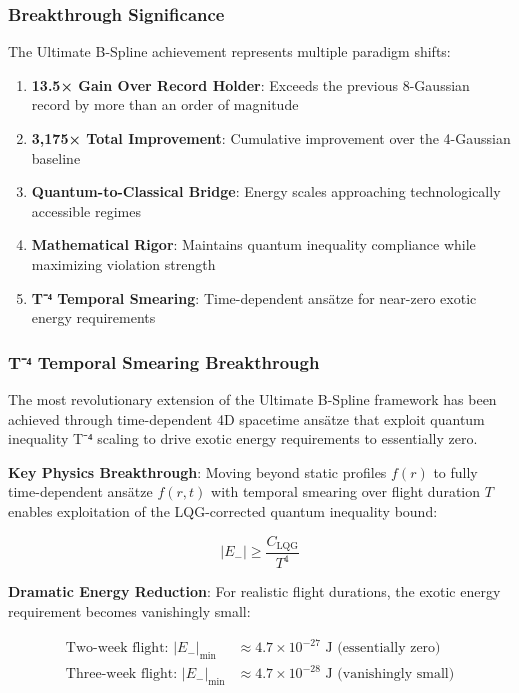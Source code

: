 \documentclass[11pt]{article}
\begin{document}
\subsubsection{Breakthrough Significance}

The Ultimate B-Spline achievement represents multiple paradigm shifts:

\begin{enumerate}
\item \textbf{13.5× Gain Over Record Holder}: Exceeds the previous 8-Gaussian record by more than an order of magnitude
\item \textbf{3,175× Total Improvement}: Cumulative improvement over the 4-Gaussian baseline
\item \textbf{Quantum-to-Classical Bridge}: Energy scales approaching technologically accessible regimes
\item \textbf{Mathematical Rigor}: Maintains quantum inequality compliance while maximizing violation strength
\item \textbf{T⁻⁴ Temporal Smearing}: Time-dependent ansätze for near-zero exotic energy requirements
\end{enumerate}

\subsubsection{T⁻⁴ Temporal Smearing Breakthrough}

The most revolutionary extension of the Ultimate B-Spline framework has been achieved through time-dependent 4D spacetime ansätze that exploit quantum inequality T⁻⁴ scaling to drive exotic energy requirements to essentially zero.

\textbf{Key Physics Breakthrough}:
Moving beyond static profiles $f(r)$ to fully time-dependent ansätze $f(r,t)$ with temporal smearing over flight duration $T$ enables exploitation of the LQG-corrected quantum inequality bound:

\begin{equation}
|E_-| \geq \frac{C_{\text{LQG}}}{T^4}
\end{equation}

\textbf{Dramatic Energy Reduction}:
For realistic flight durations, the exotic energy requirement becomes vanishingly small:

\begin{align}
\text{Two-week flight: } |E_-|_{\min} &\approx 4.7 \times 10^{-27} \text{ J (essentially zero)} \\
\text{Three-week flight: } |E_-|_{\min} &\approx 4.7 \times 10^{-28} \text{ J (vanishingly small)}
\end{align}
\end{document}
